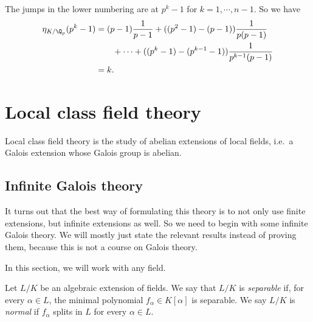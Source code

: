 \documentclass[a4paper]{article}
\begin{document}
\begin{eg}
\begin{center}
  \end{center}
  The jumps in the lower numbering are at $p^k - 1$ for $k = 1, \cdots, n -1 $. So we have
  \begin{align*}
    \eta_{K/\Q_p}(p^k - 1) &= (p - 1)\frac{1}{p - 1} + ((p^2 - 1) - (p - 1))\frac{1}{p(p - 1)} \\
    &\quad\quad+ \cdots + ((p^k - 1) - (p^{k - 1} - 1)) \frac{1}{p^{k - 1}(p - 1)} \\
    &= k.
  \end{align*}
\end{eg}

\section{Local class field theory}
Local class field theory is the study of abelian extensions of local fields, i.e.\ a Galois extension whose Galois group is abelian.

\subsection{Infinite Galois theory}
It turns out that the best way of formulating this theory is to not only use finite extensions, but infinite extensions as well. So we need to begin with some infinite Galois theory. We will mostly just state the relevant results instead of proving them, because this is not a course on Galois theory.

In this section, we will work with any field.
\begin{defi}
  Let $L/K$ be an algebraic extension of fields. We say that $L/K$ is \emph{separable} if, for every $\alpha \in L$, the minimal polynomial $f_\alpha \in K[\alpha]$ is separable. We say $L/K$ is \emph{normal} if $f_\alpha$ splits in $L$ for every $\alpha \in L$.
\end{defi}
\end{document}
